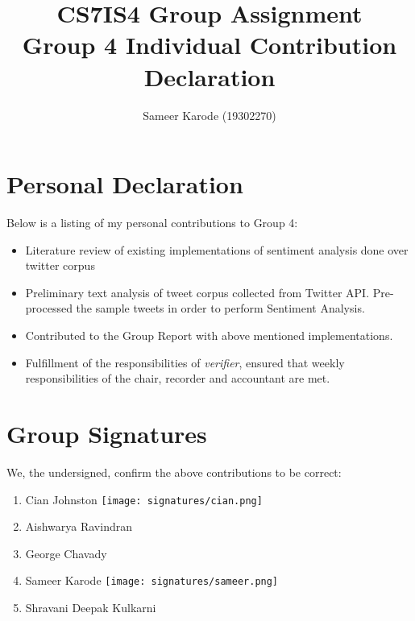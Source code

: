 \documentclass[a4paper,10pt]{article}
\begin{document}
\title{
    CS7IS4 Group Assignment \\
    \large Group 4 Individual Contribution Declaration
}
\author{
    Sameer Karode (19302270)
}

\maketitle

\section{Personal Declaration}

Below is a listing of my personal contributions to Group 4:

\begin{itemize}
    \item {Literature review of existing implementations of sentiment analysis done over twitter corpus}
    \item{
        Preliminary text analysis of tweet corpus collected from Twitter API. Pre-processed the sample tweets in order to perform Sentiment Analysis.
    }
    \item{
       Contributed to the Group Report with above mentioned implementations.
    }
    \item{
        Fulfillment of the responsibilities of \textit{verifier}, ensured that weekly responsibilities of the chair, recorder and accountant are met.
    }
\end{itemize}

\section{Group Signatures}

We, the undersigned, confirm the above contributions to be correct:

\begin{enumerate}
    \item{
        Cian Johnston \texttt{[image: signatures/cian.png]}
    }
    \item{
        Aishwarya Ravindran
    }
    \item{
        George Chavady
    }
    \item{
        Sameer Karode \texttt{[image: signatures/sameer.png]}
    }
    \item{
        Shravani Deepak Kulkarni
    }

\end{enumerate}
\end{document}
